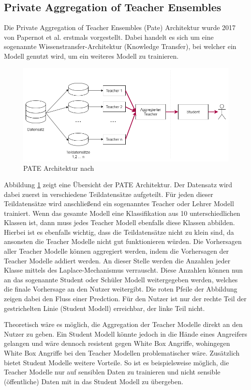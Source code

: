 \subsection{Private Aggregation of Teacher Ensembles}\label{sec:pate}

Die Private Aggregation of Teacher Ensembles (Pate) Architektur wurde 2017 von Papernot et al. \cite{P-57} erstmals vorgestellt.
Dabei handelt es sich um eine sogenannte Wissenstransfer-Architektur (Knowledge Transfer), bei welcher ein Modell genutzt wird, um ein weiteres Modell zu trainieren.

\begin{figure}[!htb]
    \centering
    \includegraphics[width=15cm]{figures/pate_basic.png}
    \caption{PATE Architektur nach \cite{P-57}}
    \label{fig:pate_basic}
\end{figure} 

Abbildung \ref{fig:pate_basic} zeigt eine Übersicht der PATE Architektur.
Der Datensatz wird dabei zuerst in verschiedene Teildatensätze aufgeteilt. 
Für jeden dieser Teildatensätze wird anschließend ein sogenanntes Teacher oder Lehrer Modell trainiert.
Wenn das gesamte Modell eine Klassifikation aus 10 unterschiedlichen Klassen ist, dann muss jedes Teacher Modell ebenfalls diese Klassen abbilden.
Hierbei ist es ebenfalls wichtig, dass die Teildatensätze nicht zu klein sind, da ansonsten die Teacher Modelle nicht gut funktionieren würden.
Die Vorhersagen aller Teacher Modelle können aggregiert werden, indem die Vorhersagen der Teacher Modelle addiert werden. 
An dieser Stelle werden die Anzahlen jeder Klasse mittels des Laplace-Mechanismus verrauscht.
Diese Anzahlen können nun an das sogenannte Student oder Schüler Modell weitergegeben werden, welches die finale Vorhersage an den Nutzer weitergibt.
Die roten Pfeile der Abbildung zeigen dabei den Fluss einer Predction. 
Für den Nutzer ist nur der rechte Teil der gestrichelten Linie (Student Modell) erreichbar, der linke Teil nicht.

Theoretisch wäre es möglich, die Aggregation der Teacher Modelle direkt an den Nutzer zu geben.
Ein Student Modell könnte jedoch in die Hände eines Angreifers gelangen und wäre dennoch resistent gegen White Box Angriffe, wohingegen White Box Angriffe bei den Teacher Modellen problematischer wäre.
Zusätzlich bietet Student Modelle weitere Vorteile. So ist es beispielsweise möglich, die Teacher Modelle nur auf sensiblen Daten zu trainieren und nicht sensible (öffentliche) Daten mit in das Student Modell zu übergeben.